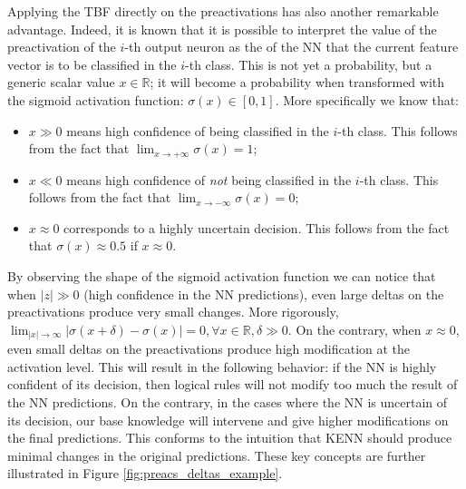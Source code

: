 Applying the TBF directly on the preactivations has also another remarkable advantage. Indeed, it is known that it is  possible to interpret the value of the preactivation of the $i$-th output neuron as the  of the NN that the current feature vector is to be classified in the $i$-th class. 
This  is not yet a probability, but a generic scalar value $x \in \mathbb{R}$; it will become a probability when transformed with the sigmoid activation function: $\sigma(x) \in \left[0,1\right]$. More specifically we know that:
\begin{itemize}
	\item $x \gg 0$ means high confidence of being classified in the $i$-th class. This follows from the fact that $\lim_{x\rightarrow +\infty} \sigma(x) = 1$;
	\item $x \ll 0$ means high confidence of \textit{not} being classified in the $i$-th class. This follows from the fact that $\lim_{x\rightarrow -\infty} \sigma(x) = 0$;
	\item $x \approx 0$ corresponds to a highly uncertain decision. This follows from the fact that $\sigma(x) \approx 0.5$ if $x \approx 0$.
\end{itemize}

By observing the shape of the sigmoid activation function we can notice that when $|z| \gg 0$ (high confidence in the NN predictions), even large deltas on the preactivations produce very small changes. 
More rigorously, $\lim_{|x| \rightarrow \infty} |\sigma(x+\delta)-\sigma(x)| = 0, \forall x\in \mathbb{R}, \delta \gg 0$. On the contrary, when $x \approx 0$, even small deltas on the preactivations produce high modification at the activation level. 
This will result in the following behavior: if the NN is highly confident of its decision, then logical rules will not modify too much the result of the NN predictions. On the contrary, in the cases where the NN is uncertain of its decision, our base knowledge will intervene and give higher modifications on the final predictions. This conforms to the intuition that KENN should produce minimal changes in the original predictions. These key concepts are further illustrated in Figure \ref{fig:preacs_deltas_example}.

